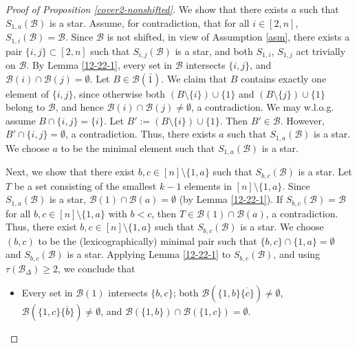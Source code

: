 \documentclass[a4paper,11pt]{article}
\newcommand{\m}{\mathcal}
\begin{document}
\begin{proof}[Proof of Proposition \ref{cover2-nonshifted}]
We show that there exists $a$ such that $S_{1,a}(\m B)$ is a star.
Assume, for contradiction, that for all $i\in [2,n]$, $S_{1,i}(\m B)=\m B$. 
Since $\m B$ is not shifted, in view of Assumption \ref{asm}, there exists a pair $\{i,j\}\subset [2,n]$ such that $S_{i,j}(\m B)$ is a star, and both $S_{1,i}$, $S_{1,j}$ act trivially on $\m B$. By Lemma \ref{12-22-1}, every set in $\m B$ intersects $\{i,j\}$, and $\m B(i)\cap \m B(j)= \emptyset$. 
Let $B\in \m B(\bar{1})$. 
We claim that $B$ contains exactly one element of $\{i,j\}$, since otherwise both $(B\setminus \{i\})\cup \{1\}$ and $(B\setminus \{j\})\cup \{1\}$ belong to $\m B$, and hence $\m B(i)\cap \m B(j)\ne \emptyset$,
a contradiction. 
We may w.l.o.g. assume $B\cap \{i,j\}=\{i\}$. Let  $B':=(B\setminus \{i\}) \cup \{1\}$. Then $B' \in \m B$. However, $B'\cap \{i,j\}=\emptyset$, a contradiction. Thus, there exists $a$ such that $S_{1,a}(\m B)$ is a star. 
We choose $a$ to be the minimal element such that $S_{1,a}(\m B)$ is a star.   
 

Next, we show that there exist $b, c \in [n]\setminus \{1,a\}$ such that $S_{b,c}(\m B)$ is a star. 
Let $T$ be a set consisting of the smallest $k-1$ elements in $[n]\setminus \{1,a\}$. 
Since $S_{1,a}(\m B)$ is a star, $\m B(1)\cap \m B(a)=\emptyset$ (by Lemma \ref{12-22-1}).
If $S_{b,c}(\m B)=\m B$ for all $b,c \in [n]\setminus \{1,a\}$ with $b<c$, then $T\in \m B(1)\cap \m B(a)$, a contradiction. Thus, there exist $b, c \in [n]\setminus \{1,a\}$ such that $S_{b,c}(\m B)$ is a star. 
We choose $(b,c)$ to be the (lexicographically) minimal pair such that $\{b,c\}\cap \{1,a\}=\emptyset$ and $S_{b,c}(\m B)$ is a star.
Applying Lemma \ref{12-22-1} to $S_{b,c}(\mathcal B)$, and using $\tau(\mathcal B_\Delta)\ge2$, we conclude that
\begin{itemize}
    \item[(P$_{bc}$)] Every set in $\m B(1)$ intersects $\{b,c\}$; 
both $\m B(\{1,b\}\overline{\{c\}})\ne \emptyset$, $ \m B(\{1,c\}\overline{\{b\}})\ne \emptyset$, and 
$\m B(\{1,b\})\cap \m B(\{1,c\})=\emptyset$.
\end{itemize}


\end{proof}
\end{document}
